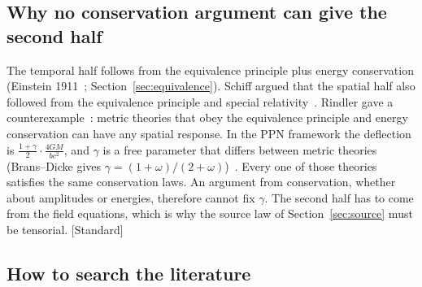\documentclass[11pt]{article}
\newcommand{\st}[1]{\textsf{\small[#1]}}
\theoremstyle{plain}
\theoremstyle{remark}
\begin{document}
\subsection{Why no conservation argument can give the second half}

The temporal half follows from the equivalence principle plus energy conservation (Einstein 1911~\cite{Einstein1911}; Section~\ref{sec:equivalence}). Schiff argued that the spatial half also followed from the equivalence principle and special relativity~\cite{Schiff1960}. Rindler gave a counterexample~\cite{Rindler1968}: metric theories that obey the equivalence principle and energy conservation can have any spatial response. In the PPN framework the deflection is $\frac{1+\gamma}{2}\cdot\frac{4GM}{bc^2}$, and $\gamma$ is a free parameter that differs between metric theories (Brans--Dicke gives $\gamma=(1+\omega)/(2+\omega)$)~\cite{Will2014}. Every one of those theories satisfies the same conservation laws. An argument from conservation, whether about amplitudes or energies, therefore cannot fix $\gamma$. The second half has to come from the field equations, which is why the source law of Section~\ref{sec:source} must be tensorial. \st{Standard}

\subsection{How to search the literature}
\end{document}
